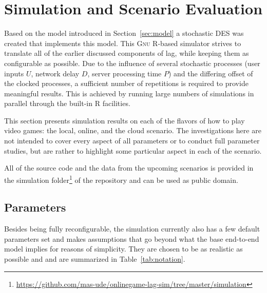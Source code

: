 \section{Simulation and Scenario Evaluation}
\label{sec:simulation}

Based on the model introduced in Section~\ref{sec:model} a stochastic 
\gls{DES} was created that implements this model. This 
\textsc{Gnu R}-based simulator strives to translate all of the earlier 
discussed components of lag, while keeping them as configurable as possible.
Due to the influence of several stochastic processes (user inputs $U$, network delay $D$, server processing time $P$) and the differing offset of the clocked processes, a sufficient number of repetitions is required to provide meaningful results. This is achieved by running large numbers of simulations in parallel through the built-in R facilities.

This section presents simulation results on each of the flavors of how to play video games: the local, online, and the cloud scenario.
The investigations here are not intended to cover every aspect of all parameters or to conduct full parameter studies, but are rather to highlight some particular aspect in each of the scenario. 

All of the source code and the data from the upcoming scenarios is provided in the simulation folder\footnote{\url{https://github.com/mas-ude/onlinegame-lag-sim/tree/master/simulation}} of the repository and can be used as public domain.


\subsection{Parameters}

Besides being fully reconfigurable, the simulation currently also has a few default parameters set and makes assumptions that go beyond what the base end-to-end model implies for reasons of simplicity. They are chosen to be as realistic as possible and and are summarized in Table~\ref{tab:notation}.

